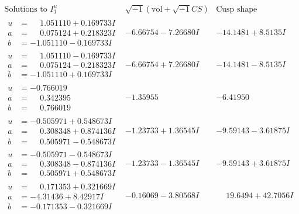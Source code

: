 \documentclass[1p]{elsarticle_modified}
\theoremstyle{definition}
\newcommand{\I}{\sqrt{-1}}
\begin{document}
$$\begin{array}{c|c|c}  
\text{Solutions to }I^u_{1}& \I (\text{vol} + \sqrt{-1}CS) & \text{Cusp shape}\\
 \hline 
\begin{aligned}
u &= \phantom{-}1.051110 + 0.169733 I \\
a &= \phantom{-}0.075124 + 0.218323 I \\
b &= -1.051110 - 0.169733 I\end{aligned}
 & -6.66754 - 7.26680 I & -14.1481 + 8.5135 I \\ \hline\begin{aligned}
u &= \phantom{-}1.051110 - 0.169733 I \\
a &= \phantom{-}0.075124 - 0.218323 I \\
b &= -1.051110 + 0.169733 I\end{aligned}
 & -6.66754 + 7.26680 I & -14.1481 - 8.5135 I \\ \hline\begin{aligned}
u &= -0.766019\phantom{ +0.000000I} \\
a &= \phantom{-}0.342395\phantom{ +0.000000I} \\
b &= \phantom{-}0.766019\phantom{ +0.000000I}\end{aligned}
 & -1.35955\phantom{ +0.000000I} & -6.41950\phantom{ +0.000000I} \\ \hline\begin{aligned}
u &= -0.505971 + 0.548673 I \\
a &= \phantom{-}0.308348 + 0.874136 I \\
b &= \phantom{-}0.505971 - 0.548673 I\end{aligned}
 & -1.23733 + 1.36545 I & -9.59143 - 3.61875 I \\ \hline\begin{aligned}
u &= -0.505971 - 0.548673 I \\
a &= \phantom{-}0.308348 - 0.874136 I \\
b &= \phantom{-}0.505971 + 0.548673 I\end{aligned}
 & -1.23733 - 1.36545 I & -9.59143 + 3.61875 I \\ \hline\begin{aligned}
u &= \phantom{-}0.171353 + 0.321669 I \\
a &= -4.31436 + 8.42917 I \\
b &= -0.171353 - 0.321669 I\end{aligned}
 & -0.16069 - 3.80568 I & \phantom{-}19.6494 + 42.7056 I \\ \hline\begin{aligned}

\end{aligned}
\end{array}$$
\end{document}
